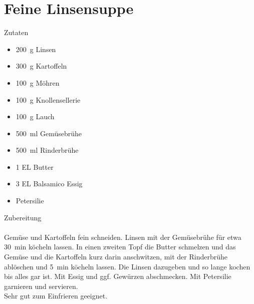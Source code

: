 \section*{Feine Linsensuppe}
\ihead{}\ohead{}
\cfoot{}
{\Large Zutaten}
\begin{multicols}{2}
\begin{itemize}
    \item \SI{200}{g} Linsen
    \item \SI{300}{g} Kartoffeln
    \item \SI{100}{g} Möhren
    \item \SI{100}{g} Knollensellerie
    \item \SI{100}{g} Lauch
    \item \SI{500}{ml} Gemüsebrühe
    \item \SI{500}{ml} Rinderbrühe
    \item \num{1} EL Butter
    \item \num{3} EL Balsamico Essig
    \item Petersilie
\end{itemize}
\end{multicols}
\noindent
{\Large Zubereitung}\\
\\
Gemüse und Kartoffeln fein schneiden. 
Linsen mit der Gemüsebrühe für etwa \SI{30}{min} köcheln lassen.
In einen zweiten Topf die Butter schmelzen und das Gemüse und die Kartoffeln kurz darin anschwitzen, mit der Rinderbrühe ablöschen und \SI{5}{min} köcheln lassen.
Die Linsen dazugeben und so lange kochen bis alles gar ist. 
Mit Essig und ggf. Gewürzen abschmecken.
Mit Petersilie garnieren und servieren.\\
Sehr gut zum Einfrieren geeignet. 